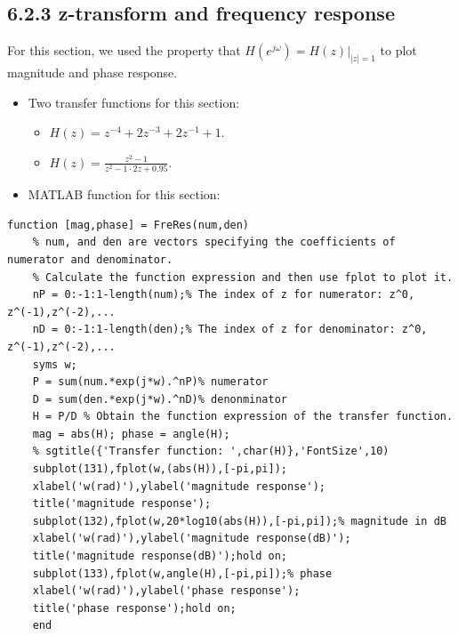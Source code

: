 \documentclass[onecolumn,oneside]{SUSTechHomework}
\begin{document}
\subsection*{6.2.3 z-transform and frequency response}
\begin{info}
    For this section, we used the property that $H(e^{j\omega})=\left.H(z)\right|_{|z|=1}$ to plot magnitude and phase response.
\end{info}
\begin{itemize}
    \item Two transfer functions for this section:
    \begin{itemize}
        \item $H(z)=z^{-4}+2 z^{-3}+2 z^{-1}+1$.
        \item $H(z)=\frac{z^{2}-1}{z^{2}-1 \cdot 2 z+0.95}$.
    \end{itemize}
    \item MATLAB function for this section:
\end{itemize}
\begin{lstlisting}[title=\textbf{FreRes.m}]
    function [mag,phase] = FreRes(num,den)
    % num, and den are vectors specifying the coefficients of numerator and denominator.
    % Calculate the function expression and then use fplot to plot it.
    nP = 0:-1:1-length(num);% The index of z for numerator: z^0, z^(-1),z^(-2),...
    nD = 0:-1:1-length(den);% The index of z for denominator: z^0, z^(-1),z^(-2),...
    syms w;
    P = sum(num.*exp(j*w).^nP)% numerator
    D = sum(den.*exp(j*w).^nD)% denonminator
    H = P/D % Obtain the function expression of the transfer function.
    mag = abs(H); phase = angle(H); 
    % sgtitle({'Transfer function: ',char(H)},'FontSize',10)
    subplot(131),fplot(w,(abs(H)),[-pi,pi]);
    xlabel('w(rad)'),ylabel('magnitude response');
    title('magnitude response');
    subplot(132),fplot(w,20*log10(abs(H)),[-pi,pi]);% magnitude in dB
    xlabel('w(rad)'),ylabel('magnitude response(dB)');
    title('magnitude response(dB)');hold on;
    subplot(133),fplot(w,angle(H),[-pi,pi]);% phase
    xlabel('w(rad)'),ylabel('phase response');
    title('phase response');hold on;
    end
\end{lstlisting}
\end{document}
